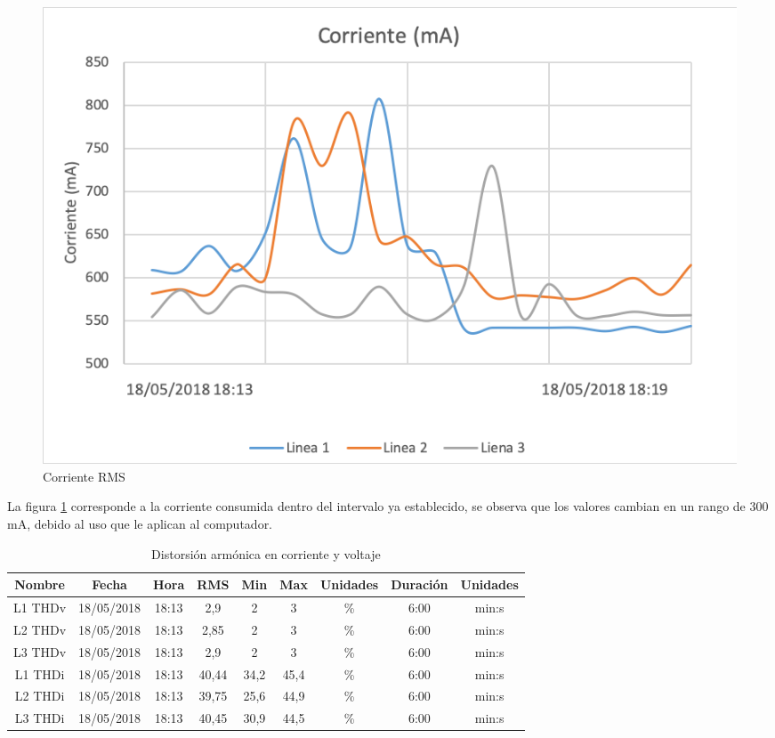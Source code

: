\begin{figure}[H]
\centering
\includegraphics{2Marco/corriente-rms}
\caption{Corriente RMS} 
\label{fig:corriente-rms}
\end{figure} 

La figura \ref{fig:corriente-rms} corresponde a la corriente consumida dentro del intervalo ya establecido, se observa que los valores cambian en un rango de 300 mA, debido al uso que le aplican al computador.

\begin{table}[!htbp]
\begin{center}
\begin{tabular}{ |c|c|c|c|c|c|c|c|c| }
\hline
Nombre & Fecha & Hora & RMS & Min & Max & Unidades & Duración & Unidades\\
\hline
L1 THDv & 18/05/2018 & 18:13 & 2,9 & 2 & 3 & \% & 6:00 & min:s\\
\hline
L2 THDv & 18/05/2018 & 18:13 & 2,85 & 2 & 3 & \% & 6:00 & min:s\\
\hline
L3 THDv & 18/05/2018 & 18:13 & 2,9 & 2 & 3 & \% & 6:00 & min:s\\
\hline
L1 THDi & 18/05/2018 & 18:13 & 40,44 & 34,2 & 45,4 & \% & 6:00 & min:s\\
\hline
L2 THDi & 18/05/2018 & 18:13 & 39,75 & 25,6 & 44,9 & \% & 6:00 & min:s\\
\hline
L3 THDi & 18/05/2018 & 18:13 & 40,45 & 30,9 & 44,5 & \% & 6:00 & min:s\\
\hline
\end{tabular}
\end{center}
\caption{Distorsión armónica en corriente y voltaje}
\label{tab:distorsion-armonica}
\end{table}

